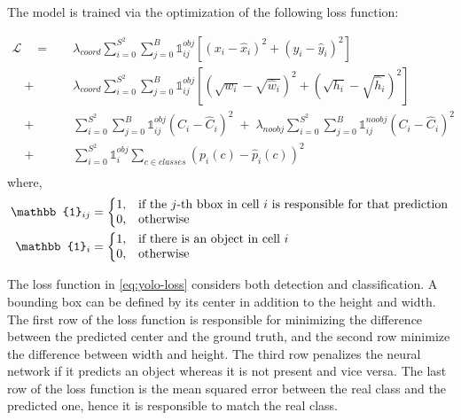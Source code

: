 The model is trained via the optimization of the following loss function:

\begin{equation}\label{eq:yolo-loss}
    \begin{split}
        \mathcal{L} \quad =  \quad  &
            \lambda_{coord} \sum_{i=0}^{S^2} \sum_{j=0}^{B} \mathbb{1}_{ij}^{obj}
            [(x_i - \hat x_i)^2 + (y_i - \hat y_i)^2]\\
            \quad + \quad & \lambda_{coord} \sum_{i=0}^{S^2} \sum_{j=0}^{B} \mathbb{1}_{ij}^{obj}
                [(\sqrt{w_i} - \sqrt{\hat w_i})^2 + (\sqrt{h_i} - \sqrt{\hat h_i})^2]\\
            \quad + \quad & \sum_{i=0}^{S^2} \sum_{j=0}^{B} \mathbb{1}_{ij}^{obj}
                (C_i - \hat C_i)^2 \; + \; \lambda_{noobj} \sum_{i=0}^{S^2} \sum_{j=0}^{B} \mathbb{1}_{ij}^{noobj}(C_i - \hat C_i)^2\\
            \quad + \quad & \sum_{i=0}^{S^2} \mathbb{1}_{i}^{obj} \sum_{c \in classes}
                (p_i(c) - \hat p_i (c))^2\\
    \end{split}
\end{equation}
where,
\begin{align*}
    \mathbb{1}_{ij}&=\left\{
        \begin{array}{@{}ll@{}}
            1, & \text{if the } j \text{-th bbox in cell } i \text{ is responsible for that prediction}\\
            0, & \text{otherwise}
        \end{array}\right.\\
    \mathbb{1}_{i}&=\left\{
        \begin{array}{@{}ll@{}}
            1, & \text{if there is an object in cell}\ i \\
            0, & \text{otherwise}
        \end{array}\right.
\end{align*}


The loss function in \autoref{eq:yolo-loss} considers both detection and classification. A bounding box can be defined by its center in addition to the height and width. The first row of the loss function is responsible for minimizing the difference between the predicted center and the ground truth, and the second row minimize the difference between width and height.
The third row penalizes the neural network if it predicts an object whereas it is not present and vice versa. The last row of the loss function is the mean squared error between the real class and the predicted one, hence it is responsible to match the real class.


